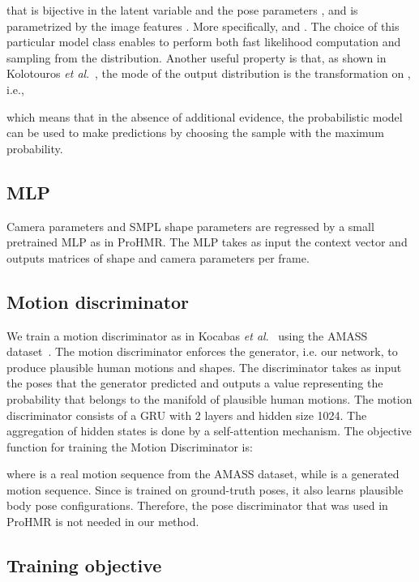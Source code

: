 \documentclass[runningheads]{llncs}
\newcommand{\etal}{\textit{et al}.}
\begin{document}
that is bijective in the latent variable  and the pose parameters , and is parametrized by the image features . More specifically, 
 and .
The choice of this particular model class enables to perform both fast
likelihood computation and sampling from the distribution. Another useful property is that, as shown in Kolotouros \etal~\cite{kolotouros2021prohmr}, the mode of the output distribution is the transformation on , i.e.,

which means that in the absence of additional evidence, the probabilistic model can be used to make predictions by choosing the sample with the maximum probability.



\subsection{MLP}

Camera parameters  and SMPL shape parameters  are regressed by a small pretrained MLP as in ProHMR. The MLP takes as input the context vector  and outputs matrices of shape and camera parameters per frame.

\subsection{Motion discriminator}
\label{sec:md}
We train a motion discriminator as in Kocabas \etal~\cite{kocabas2019vibe} using the AMASS dataset~\cite{AMASS:ICCV:2019}. The motion discriminator enforces the generator, i.e. our network, to produce plausible human motions and shapes. The discriminator takes as input the poses  that the generator predicted and outputs a value  representing the probability that  belongs to the manifold of plausible human motions.
The motion discriminator consists of a GRU with 2 layers and hidden size 1024. The aggregation of hidden states is done by a self-attention mechanism.
The objective function for training the Motion Discriminator is:

where  is a real motion sequence from the AMASS
dataset, while  is a generated motion sequence. Since
 is trained on ground-truth poses, it also learns plausible body pose configurations. Therefore, the pose discriminator that was used in ProHMR is not needed in our method.


\subsection{Training objective}
\end{document}
